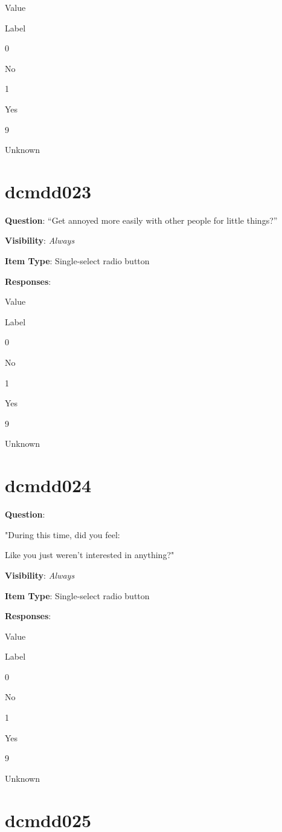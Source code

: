 \documentclass[]{book}
\begin{document}
Value

Label

0

No

1

Yes

9

Unknown

\hypertarget{dcmdd023}{%
\section{dcmdd023}\label{dcmdd023}}

\textbf{Question}: ``Get annoyed more easily with other people for little things?''

\textbf{Visibility}: \emph{Always}

\textbf{Item Type}: Single-select radio button

\textbf{Responses}:

Value

Label

0

No

1

Yes

9

Unknown

\hypertarget{dcmdd024}{%
\section{dcmdd024}\label{dcmdd024}}

\textbf{Question}:

"During this time, did you feel:

Like you just weren't interested in anything?"

\textbf{Visibility}: \emph{Always}

\textbf{Item Type}: Single-select radio button

\textbf{Responses}:

Value

Label

0

No

1

Yes

9

Unknown

\hypertarget{dcmdd025}{%
\section{dcmdd025}\label{dcmdd025}}
\end{document}
